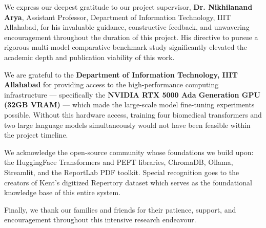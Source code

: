 \begin{abstract}
\begin{spacing}{1.5}
\textbf{Keywords:} Homeopathic Repertorization, Biomedical Named Entity Recognition, Dense Retrieval, Clinical Decision Support, Large Language Models, Parameter-Efficient Fine-Tuning, QLoRA, ChromaDB.

\end{spacing}
\end{abstract}


\begin{acknowledgements}
\begin{spacing}{1.5}
\addchaptertocentry{\acknowledgementname}

We express our deepest gratitude to our project supervisor, \textbf{Dr. Nikhilanand Arya}, Assistant Professor, Department of Information Technology, IIIT Allahabad, for his invaluable guidance, constructive feedback, and unwavering encouragement throughout the duration of this project. His directive to pursue a rigorous multi-model comparative benchmark study significantly elevated the academic depth and publication viability of this work.

We are grateful to the \textbf{Department of Information Technology, IIIT Allahabad} for providing access to the high-performance computing infrastructure --- specifically the \textbf{NVIDIA RTX 5000 Ada Generation GPU (32GB VRAM)} --- which made the large-scale model fine-tuning experiments possible. Without this hardware access, training four biomedical transformers and two large language models simultaneously would not have been feasible within the project timeline.

We acknowledge the open-source community whose foundations we build upon: the HuggingFace Transformers and PEFT libraries, ChromaDB, Ollama, Streamlit, and the ReportLab PDF toolkit. Special recognition goes to the creators of Kent's digitized Repertory dataset which serves as the foundational knowledge base of this entire system.

Finally, we thank our families and friends for their patience, support, and encouragement throughout this intensive research endeavour.

\end{spacing}
\end{acknowledgements}


